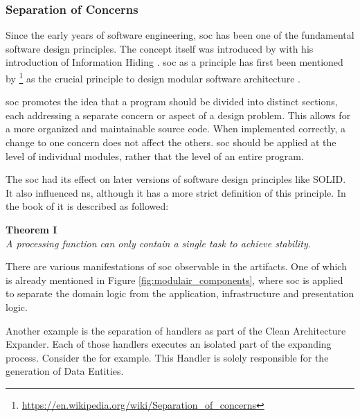 \subsubsection{Separation of Concerns}

Since the early years of software engineering, \gls{soc} has been one of the fundamental
software design principles. The concept itself was introduced by
\citeauthor{parnas_criteria_1972} with his introduction of Information Hiding
\parencite{parnas_criteria_1972}. \gls{soc} as a principle has first been mentioned by
\citeauthor{dijkstra_selected_1982}\footnote{\url{https://en.wikipedia.org/wiki/Separation_of_concerns}}
as the crucial principle to design modular software architecture
\parencite[]{dijkstra_selected_1982}. 

\gls{soc} promotes the idea that a program should be divided into distinct sections, each
addressing a separate concern or aspect of a design problem. This allows for a more
organized and maintainable source code. When implemented correctly, a change to one
concern does not affect the others. \gls{soc} should be applied at the level of individual
modules, rather that the level of an entire program.

The \gls{soc} had its effect on later versions of software design principles like SOLID.
It also influenced \gls{ns}, although it has a more strict definition of this principle.
In the book of \citeauthor{mannaert_normalized_2016} it is described as followed: 

\begin{center}
    \textbf{Theorem I}\\
    \textit{A processing function can only contain a single task to achieve stability.}    
\end{center}

There are various manifestations of \gls{soc} observable in the artifacts. One of which is
already mentioned in Figure \ref{fig:modulair_components}, where \gls{soc} is applied to
separate the domain logic from the application, infrastructure and presentation logic.

Another example is the separation of handlers as part of the Clean Architecture Expander.
Each of those handlers executes an isolated part of the expanding process. Consider the
\parencite{koks_expandentitieshandlerinteractor_2023} for example. This Handler is solely
responsible for the generation of Data Entities. 

